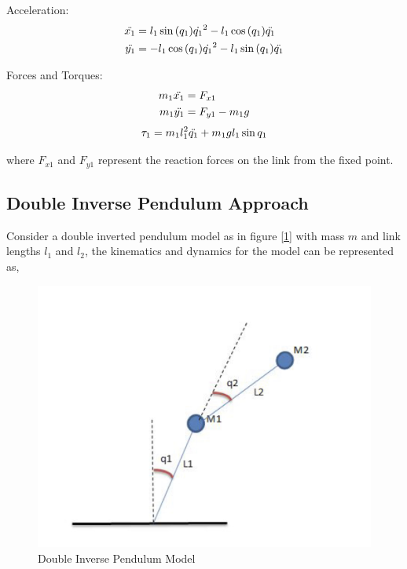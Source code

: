 Acceleration:
\begin{equation}
\begin{split}
    \Ddot{x_1} &= l_1 \sin{(q_1)}\Dot{q_1}^2 - l_1\cos{(q_1)}\Ddot{q_1} \\
    \Ddot{y_1} &= -l_1 \cos{(q_1)}\Dot{q_1}^2 - l_1 \sin{(q_1)}\Ddot{q_1}
\end{split}
\end{equation}

Forces and Torques:
\begin{equation}
\begin{split}
    m_1\Ddot{x_1} &= F_{x1} \\
    m_1\Ddot{y_1} &= F_{y1} - m_1g
\end{split} 
\end{equation}
\begin{equation}
    \tau_1 = m_1l_1^2\Ddot{q_1} + m_1gl_1\sin{q_1}
\end{equation}

where $F_{x1}$ and $F_{y1}$ represent the reaction forces on the link from the fixed point.

\subsection{Double Inverse Pendulum Approach}

Consider a double inverted pendulum model as in figure [\ref{dipm}] with mass $m$ and link lengths $l_1$ and $l_2$, the kinematics and dynamics for the model can be represented as,

\begin{figure}[h!]
    \centering
    \includegraphics[scale=0.15]{images/dipm.jpeg}\hfill
    \caption{Double Inverse Pendulum Model}\hfill
    \label{dipm}
\end{figure}

